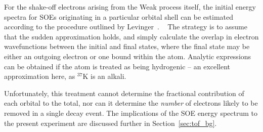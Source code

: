 For the shake-off electrons arising from the Weak process itself, the initial energy spectra for SOEs originating in a particular orbital shell can be estimated according to the procedure outlined by Levinger~\cite{Levinger}.
~  \noindent
The strategy is to assume that the sudden approximation holds, and simply calculate the overlap in electron wavefunctions between the initial and final states, where the final state may be either an outgoing electron or one bound within the atom.  Analytic expressions can be obtained if the atom is treated as being hydrogenic -- an excellent approximation here, as $^{37}\textrm{K}$ is an alkali.  

Unfortunately, this treatment cannot determine the fractional contribution of each orbital to the total, nor can it determine the \emph{number} of electrons likely to be removed in a single decay event.  The implications of the SOE energy spectrum to the present experiment are discussed further in Section~\ref{sec:tof_bg}.





